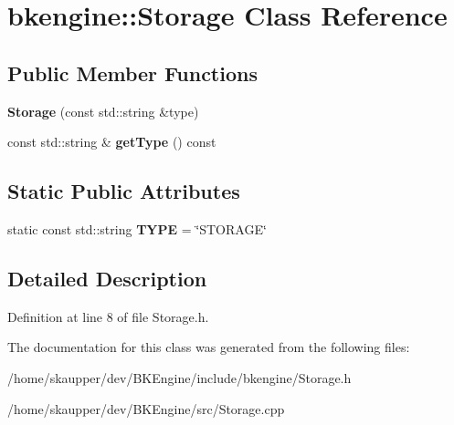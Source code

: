 \hypertarget{classbkengine_1_1Storage}{}\section{bkengine\+:\+:Storage Class Reference}
\label{classbkengine_1_1Storage}
\subsection*{Public Member Functions}
\begin{DoxyCompactItemize}
\item 
\mbox{\label{classbkengine_1_1Storage_aabb685ee2db8aea1090f0b88aff3c8bb}} 
{\bfseries Storage} (const std\+::string \&type)
\item 
\mbox{\label{classbkengine_1_1Storage_afa7bcd7e54058dddde2407ffff451436}} 
const std\+::string \& {\bfseries get\+Type} () const
\end{DoxyCompactItemize}
\subsection*{Static Public Attributes}
\begin{DoxyCompactItemize}
\item 
\mbox{\label{classbkengine_1_1Storage_a92b3d2d6295531b85638cfdb6d1b55b4}} 
static const std\+::string {\bfseries T\+Y\+PE} = \char`\"{}S\+T\+O\+R\+A\+GE\char`\"{}
\end{DoxyCompactItemize}


\subsection{Detailed Description}


Definition at line 8 of file Storage.\+h.



The documentation for this class was generated from the following files\+:\begin{DoxyCompactItemize}
\item 
/home/skaupper/dev/\+B\+K\+Engine/include/bkengine/Storage.\+h\item 
/home/skaupper/dev/\+B\+K\+Engine/src/Storage.\+cpp\end{DoxyCompactItemize}
